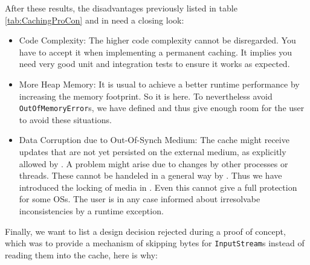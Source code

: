 After these results, the disadvantages previously listed in table \hyperref[tab:CachingProCon]{\ref{tab:CachingProCon}} and in  need a closing look:
\begin{itemize}
\item Code Complexity: The higher code complexity cannot be disregarded. You have to accept it when implementing a permanent caching. It implies you need very good unit and integration tests to ensure it works as expected.
\item More Heap Memory: It is usual to achieve a better runtime performance by increasing the memory footprint. So it is here. To nevertheless avoid \texttt{OutOfMemoryError}s, we have defined  and thus give enough room for the user to avoid these situations.
\item Data Corruption due to Out-Of-Synch Medium: The cache might receive updates that are not yet persisted on the external medium, as explicitly allowed by  . A problem might arise due to changes by other processes or threads. These cannot be handeled in a general way by \LibName{}. Thus we have introduced the locking of media in . Even this cannot give a full protection for some OSs. The user is in any case informed about irresolvabe inconsistencies by a runtime exception.
\end{itemize}

Finally, we want to list a design decision rejected during a proof of concept, which was to provide a mechanism of skipping bytes for \texttt{InputStream}s instead of reading them into the cache, here is why:

